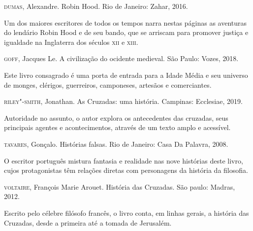 \documentclass[12pt]{extarticle}
\begin{document}
\textsc{dumas}, Alexandre. Robin Hood. Rio de Janeiro: Zahar, 2016.

Um dos maiores escritores de todos os tempos narra nestas páginas as
aventuras do lendário Robin Hood e de seu bando, que se arriscam para
promover justiça e igualdade na Inglaterra dos séculos \textsc{xii} e \textsc{xiii}.

\textsc{goff}, Jacques Le. A civilização do ocidente medieval. São Paulo:
Vozes, 2018.

Este livro consagrado é uma porta de entrada para a Idade Média e seu
universo de monges, clérigos, guerreiros, camponeses, artesãos e
comerciantes.

\textsc{riley"-smith}, Jonathan. As Cruzadas: uma história. Campinas:
Ecclesiae, 2019.

Autoridade no assunto, o autor explora os antecedentes das cruzadas,
seus principais agentes e acontecimentos, através de um texto amplo e
acessível.

\textsc{tavares}, Gonçalo. Histórias falsas. Rio de Janeiro: Casa Da
Palavra, 2008.

O escritor português mistura fantasia e realidade nas nove histórias
deste livro, cujos protagonistas têm relações diretas com personagens da
história da filosofia.

\textsc{voltaire}, François Marie Arouet. História das Cruzadas. São paulo: Madras, 2012.

Escrito pelo célebre filósofo francês, o livro conta, em linhas gerais,
a história das Cruzadas, desde a primeira até a tomada de Jerusalém.
\end{document}

